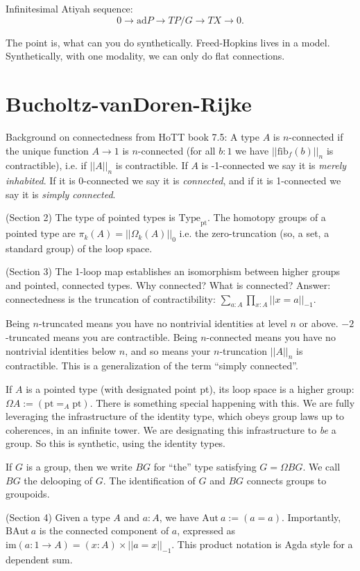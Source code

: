 \documentclass[12pt]{article}
\newcommand{\pt}{\mathrm{pt}}
\newcommand{\Aut}{\mathrm{Aut}}
\newcommand{\BAut}{\mathrm{BAut}}
\newcommand{\im}{\mathrm{im}}
\begin{document}
Infinitesimal Atiyah sequence: \[ 0 \to \mathrm{ad}P \to TP/G \to TX \to 0.\]

The point is, what can you do synthetically. Freed-Hopkins lives in a model. Synthetically, with one modality, we can only do flat connections.

\section{Bucholtz-vanDoren-Rijke}
Background on connectedness from HoTT book 7.5: A type $A$ is $n$-connected if the unique function $A\to 1$ is $n$-connected (for all $b : 1$ we have $||\mathrm{fib}_f(b)||_n$ is contractible), i.e. if $||A||_n$ is contractible. If $A$ is -1-connected we say it is \emph{merely inhabited}. If it is 0-connected we say it is \emph{connected}, and if it is 1-connected we say it is \emph{simply connected}.

(Section 2) The type of pointed types is $\mathrm{Type}_\mathrm{pt}$. The homotopy groups of a pointed type are $\pi_k(A) = ||{\Omega_k(A)}||_0$ i.e. the zero-truncation (so, a set, a standard group) of the loop space.

(Section 3) The 1-loop map establishes an isomorphism between higher groups and pointed, connected types. Why connected? What is connected? Answer: connectedness is the truncation of contractibility: $\sum_{a:A}\prod_{x:A}||x=a||_{-1}$.

Being $n$-truncated means you have no nontrivial identities at level $n$ or above. $-2$-truncated means you are contractible. Being $n$-connected means you have no nontrivial identities below $n$, and so means your $n$-truncation $||A||_n$ is contractible. This is a generalization of the term ``simply connected''.

If $A$ is a pointed type (with designated point pt), its loop space is a higher group: $\Omega A := (\pt =_A \pt)$. There is something special happening with this. We are fully leveraging the infrastructure of the identity type, which obeys group laws up to coherences, in an infinite tower. We are designating this infrastructure to \emph{be} a group. So this is synthetic, using the identity types.

If $G$ is a group, then we write $BG$ for ``the'' type satisfying $G=\Omega BG$. We call $BG$ the delooping of $G$. The identification of $G$ and $BG$ connects groups to groupoids.

(Section 4) Given a type $A$ and $a : A$, we have $\Aut\ a := (a = a)$. Importantly, $\BAut\ a$ is the connected component of $a$, expressed as $\im(a : 1 \to A) = (x : A) \times ||a = x||_{-1}$. This product notation is Agda style for a dependent sum.
\end{document}

